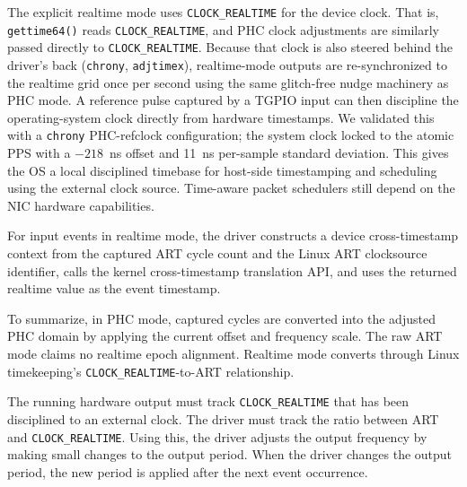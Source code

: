 \documentclass[conference,a4paper]{IEEEtran}
\newcommand{\ClRT}{\texttt{CLOCK\_REALTIME}\xspace}
\begin{document}
The explicit realtime mode uses {\ClRT} for the device clock. That is, \texttt{gettime64()} reads \ClRT, and PHC clock adjustments are similarly passed directly to {\ClRT}. Because that clock is also steered behind the driver's back (\texttt{chrony}, \texttt{adjtimex}), realtime-mode outputs are re-synchronized to the realtime grid once per second using the same glitch-free nudge machinery as PHC mode. A reference pulse captured by a TGPIO input can then discipline the operating-system clock directly from hardware timestamps. We validated this with a \texttt{chrony} PHC-refclock configuration; the system clock locked to the atomic PPS with a $-218$~ns offset and 11~ns per-sample standard deviation. This gives the OS a local disciplined timebase for host-side timestamping and scheduling using the external clock source. Time-aware packet schedulers still depend on the NIC hardware capabilities.

For input events in realtime mode, the driver constructs a device cross-timestamp context from the captured ART cycle count and the Linux ART clocksource identifier, calls the kernel cross-timestamp translation API, and uses the returned realtime value as the event timestamp.

To summarize, in PHC mode, captured cycles are converted into the adjusted PHC domain by applying the current offset and frequency scale. The raw ART mode claims no realtime epoch alignment. Realtime mode converts through Linux timekeeping's {\ClRT}-to-ART relationship.


The running hardware output must track {\ClRT} that has been disciplined to an external clock. The driver must track the ratio between ART and {\ClRT}. Using this, the driver adjusts the output frequency by making small changes to the output period. When the driver changes the output period, the new period is applied after the next event occurrence. 

\end{document}
